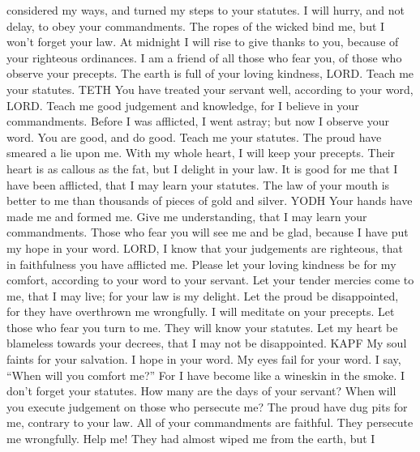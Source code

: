 considered my ways, and turned my steps to your statutes.
 I will hurry, and not delay, to obey your commandments.
 The ropes of the wicked bind me, but I won't forget your
law.  At midnight I will rise to give thanks to you,
because of your righteous ordinances.  I am a friend of
all those who fear you, of those who observe your precepts.
 The earth is full of your loving kindness, LORD. Teach
me your statutes. TETH  You have treated your servant
well, according to your word, LORD.  Teach me good
judgement and knowledge, for I believe in your commandments.
 Before I was afflicted, I went astray; but now I observe
your word.  You are good, and do good. Teach me your
statutes.  The proud have smeared a lie upon me. With my
whole heart, I will keep your precepts.  Their heart is
as callous as the fat, but I delight in your law.  It is
good for me that I have been afflicted, that I may learn your statutes.
 The law of your mouth is better to me than thousands of
pieces of gold and silver. YODH  Your hands have made me
and formed me. Give me understanding, that I may learn your
commandments.  Those who fear you will see me and be
glad, because I have put my hope in your word.  LORD, I
know that your judgements are righteous, that in faithfulness you have
afflicted me.  Please let your loving kindness be for my
comfort, according to your word to your servant.  Let
your tender mercies come to me, that I may live; for your law is my
delight.  Let the proud be disappointed, for they have
overthrown me wrongfully. I will meditate on your precepts.
 Let those who fear you turn to me. They will know your
statutes.  Let my heart be blameless towards your
decrees, that I may not be disappointed. KAPF  My soul
faints for your salvation. I hope in your word.  My eyes
fail for your word. I say, ``When will you comfort me?'' 
For I have become like a wineskin in the smoke. I don't forget your
statutes.  How many are the days of your servant? When
will you execute judgement on those who persecute me? 
The proud have dug pits for me, contrary to your law. 
All of your commandments are faithful. They persecute me wrongfully.
Help me!  They had almost wiped me from the earth, but I
